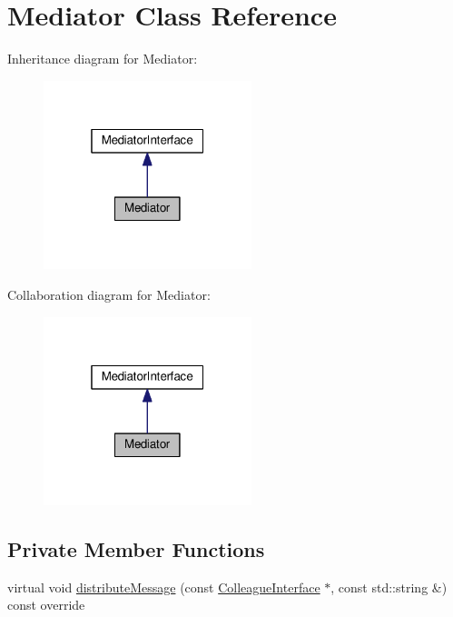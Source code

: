 \hypertarget{classMediator}{}\section{Mediator Class Reference}
\label{classMediator}


Inheritance diagram for Mediator\+:
\nopagebreak
\begin{figure}[H]
\begin{center}
\leavevmode
\includegraphics[width=172pt]{classMediator__inherit__graph}
\end{center}
\end{figure}


Collaboration diagram for Mediator\+:
\nopagebreak
\begin{figure}[H]
\begin{center}
\leavevmode
\includegraphics[width=172pt]{classMediator__coll__graph}
\end{center}
\end{figure}
\subsection*{Private Member Functions}
\begin{DoxyCompactItemize}
\item 
virtual void \hyperlink{classMediator_a6dafbc84aae81e04af696169924b04fc}{distribute\+Message} (const \hyperlink{classColleagueInterface}{Colleague\+Interface} $\ast$, const std\+::string \&) const override
\end{DoxyCompactItemize}
